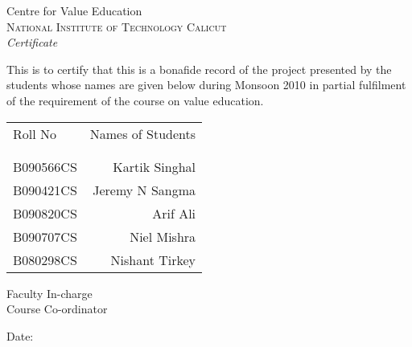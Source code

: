 \newpage
\thispagestyle{empty}

\begin{center}

\huge{Centre for Value Education}\\
\normalsize
\textsc{National Institute of Technology Calicut}\\[2.0cm]

\emph{\LARGE Certificate}\\[2.5cm]
\end{center}
\normalsize This is to certify that this is a bonafide record of the project presented by the students whose names are given below during Monsoon 2010 in partial fulfilment of the requirement of the course on value education.\\[1.0cm]

\begin{table}[h]
\centering
\begin{tabular}{lr}
Roll No & Names of Students \\ \\ \hline
\\
B090566CS & Kartik Singhal \\ 
B090421CS & Jeremy N Sangma \\ 
B090820CS & Arif Ali \\ 
B090707CS & Niel Mishra \\ 
B080298CS & Nishant Tirkey \\
\end{tabular}
\end{table}

\vfill


\begin{flushright}
Faculty In-charge\\[1.5cm]
Course Co-ordinator\\[1.0cm]
\end{flushright}

\begin{flushleft}
Date:
\end{flushleft}
